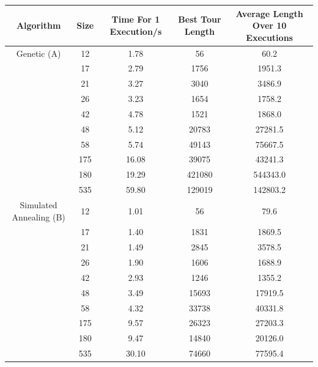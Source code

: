 \documentclass{article}
\begin{document}
\begin{center}
\begin{tabular}{|c|c|c|c|c|}
\hline
Algorithm & Size & Time For 1 Execution/s & Best Tour Length & Average Length Over 10 Executions\\
\hline
Genetic (A) & 12 & 1.78 & 56 & 60.2\\
\hline
 & 17 & 2.79 & 1756 & 1951.3\\
 \hline
 & 21 & 3.27 & 3040 & 3486.9\\
 \hline
 & 26 & 3.23 & 1654 & 1758.2\\
 \hline
 & 42 & 4.78 & 1521 & 1868.0\\
 \hline
 & 48 & 5.12 & 20783 & 27281.5\\
 \hline
 & 58 & 5.74 & 49143 & 75667.5\\
 \hline
 & 175 & 16.08 & 39075 & 43241.3\\
 \hline
 & 180 & 19.29 & 421080 & 544343.0\\
 \hline 
 & 535 & 59.80 & 129019 & 142803.2\\
 \hline
Simulated Annealing (B) & 12 & 1.01 & 56 & 79.6\\
\hline
 & 17 & 1.40 & 1831 & 1869.5\\
 \hline
 & 21 & 1.49 & 2845 & 3578.5\\
 \hline
 & 26 & 1.90 & 1606 & 1688.9\\
 \hline
 & 42 & 2.93 & 1246 & 1355.2\\
 \hline
 & 48 & 3.49 & 15693 & 17919.5\\
 \hline
 & 58 & 4.32 & 33738 & 40331.8\\
 \hline
 & 175 & 9.57 & 26323 & 27203.3\\
 \hline
 & 180 & 9.47 & 14840 & 20126.0\\
 \hline 
 & 535 & 30.10 & 74660 & 77595.4\\
 \hline
\end{tabular}
\end{center}
\end{document}
